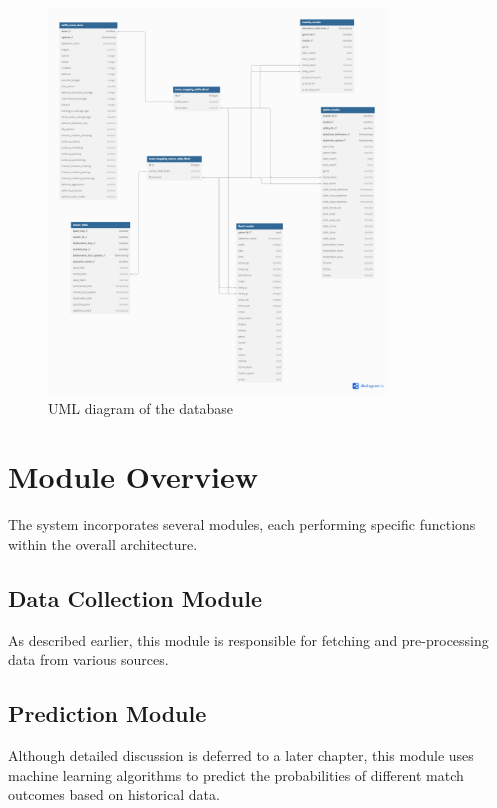 \begin{figure}[H]
    \centering
    \includegraphics[width=0.8\textwidth, keepaspectratio]{images/db_uml.png}
    \caption{UML diagram of the database}
    \label{fig:uml_db}
\end{figure}

\section{Module Overview}

The system incorporates several modules, each performing specific functions within the overall architecture.

\subsection{Data Collection Module}

As described earlier, this module is responsible for fetching and pre-processing data from various sources.

\subsection{Prediction Module}

Although detailed discussion is deferred to a later chapter, this module uses machine learning algorithms to predict the probabilities of different match outcomes based on historical data.

